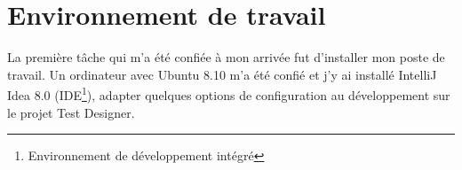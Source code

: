 
\section{Environnement de travail}
La première tâche qui m'a été confiée à mon arrivée fut d'installer mon poste de travail. Un ordinateur avec Ubuntu 8.10 m'a été confié et j'y ai installé IntelliJ Idea 8.0 (IDE\footnote{Environnement de développement intégré}), adapter quelques options de configuration au développement sur le projet Test Designer.


